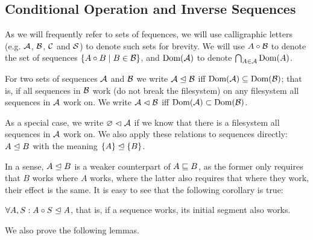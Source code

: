 

\subsection{Conditional Operation and Inverse Sequences}

\begin{mydef}
As we will frequently refer to sets of fequences,
we will use calligraphic letters (e.g. $\mathcal{A}$, $\mathcal{B}$, $\mathcal{C}$ and $\mathcal{S}$)
to denote such sets for brevity.
We will use $A\circ\mathcal{B}$ to denote the set of sequences $\{A\circ B\mathrel{|} B\in\mathcal{B}\}$,
and $\textrm{Dom}({\mathcal{A}})$ to denote $\bigcap_{A\in\mathcal{A}} \textrm{Dom}({A})$.
\end{mydef}


\begin{mydef}[$\worksmsign$, $\worksmeqsign$]
For two sets of sequences $\mathcal{A}$ and $\mathcal{B}$
we write ${\mathcal{A}}\trianglelefteq{\mathcal{B}}$ iff $\textrm{Dom}({\mathcal{A}}) \subseteq \textrm{Dom}({\mathcal{B}})$;
that is, if all sequences in $\mathcal{B}$ work (do not break the filesystem)
on any filesystem all sequences in $\mathcal{A}$ work on.
We write ${\mathcal{A}}\vartriangleleft{\mathcal{B}}$ iff $\textrm{Dom}({\mathcal{A}}) \subset \textrm{Dom}({\mathcal{B}})$.

As a special case, we write ${\varnothing}\vartriangleleft{\mathcal{A}}$ if we know that there is a filesystem
all sequences in $\mathcal{A}$ work on.
We also apply these relations to sequences directly:
${A}\trianglelefteq{B}$ with the meaning ${\{A\}}\trianglelefteq{\{B\}}$.
\end{mydef}

In a sense, $A\trianglelefteq B$ is a weaker counterpart of $A\sqsubseteq B$, as the former
only requires that $B$ works where $A$ works, where the latter also requires
that where they work, their effect is the same.
It is easy to see that the following corollary is true:

\begin{mycor}\label{worksextpostfix}
$\forall A,S: {A\circ S}\trianglelefteq{A}$, that is, if a sequence works, its initial segment also works.
\end{mycor}

We also prove the following lemmas.

